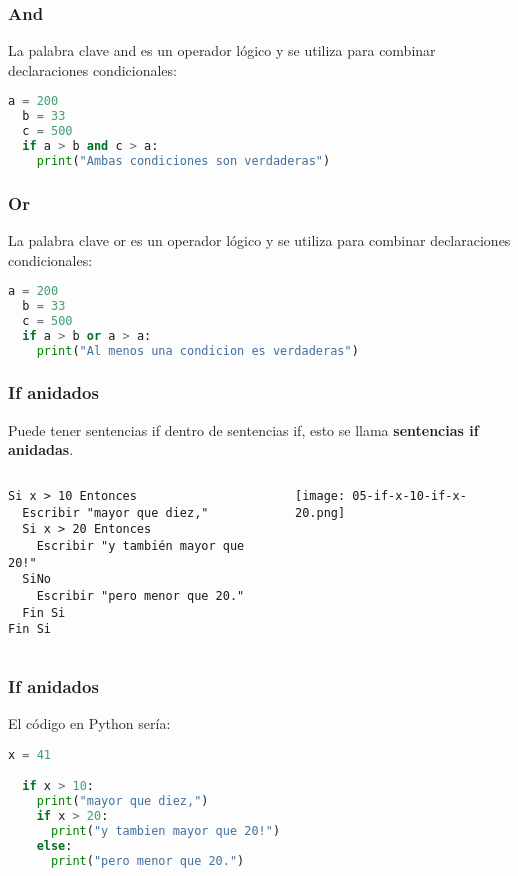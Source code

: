 \begin{frame}[fragile]
  \frametitle{And}

  La palabra clave \textcolor{codeKeyword}{and} es un operador lógico y
  se utiliza para combinar declaraciones condicionales: 

  \vspace{\baselineskip}
  \begin{lstlisting}[language=Python]
  a = 200
  b = 33
  c = 500
  if a > b and c > a:
    print("Ambas condiciones son verdaderas")
  \end{lstlisting}
\end{frame}

\begin{frame}[fragile]
  \frametitle{Or}

  La palabra clave \textcolor{codeKeyword}{or} es un operador lógico y
  se utiliza para combinar declaraciones condicionales: 

  \vspace{\baselineskip}
  \begin{lstlisting}[language=Python]
  a = 200
  b = 33
  c = 500
  if a > b or a > a:
    print("Al menos una condicion es verdaderas")
  \end{lstlisting}
\end{frame}

\begin{frame}[fragile]
  \frametitle{If anidados}

  Puede tener sentencias if dentro de sentencias if, esto se llama
  \textbf{sentencias if anidadas}.

  \begin{columns}
    \begin{lstlisting}[style=pseudocodigo]
Si x > 10 Entonces
  Escribir "mayor que diez,"
  Si x > 20 Entonces
    Escribir "y también mayor que 20!"
  SiNo
    Escribir "pero menor que 20."
  Fin Si
Fin Si\end{lstlisting}
    \pausa
    \texttt{[image: 05-if-x-10-if-x-20.png]}
  \end{columns}
\end{frame}

\begin{frame}[fragile]
  \frametitle{If anidados}

  El código en Python sería:

  \vspace{\baselineskip}
  \begin{lstlisting}[language=Python]
  x = 41

  if x > 10:
    print("mayor que diez,")
    if x > 20:
      print("y tambien mayor que 20!")
    else:
      print("pero menor que 20.")
  \end{lstlisting}
\end{frame}

